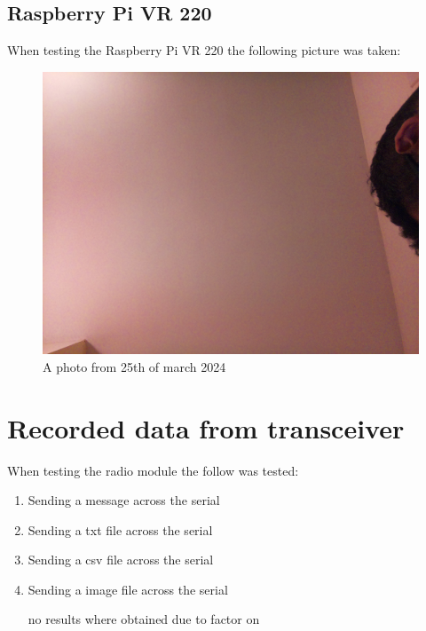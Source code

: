 \subsection{Raspberry Pi VR 220}
When testing  the Raspberry Pi VR 220 the following picture was taken:
\begin{figure}[h!]
    \centering
    \includegraphics[width=0.4\linewidth]{Images/camera_output_2024-03-21_21-43-16.png}
    \caption{A photo from 25th of march 2024 }
    \label{A photo from 25th of march 2024}
\end{figure}

\section{Recorded data from transceiver}
When testing  the radio module the follow was tested:
\begin{enumerate}
    \item Sending a message across the serial

    \item Sending a txt file across the serial

    \item Sending a csv file across the serial


    \item Sending a image file across the serial

    no results where obtained due to  factor on \pageref{Discussion of Lora module}
\end{enumerate}
